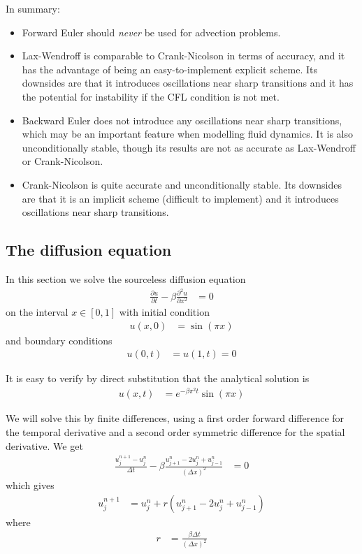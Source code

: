 \documentclass[twocolumn]{myarticle}
\begin{document}
In summary:
\begin{itemize}
\item
    Forward Euler should \emph{never} be used for advection problems.
\item
    Lax-Wendroff is comparable to Crank-Nicolson in terms of accuracy, and it has the advantage of being an easy-to-implement explicit scheme.
    Its downsides are that it introduces oscillations near sharp transitions and it has the potential for instability if the CFL condition is not met.
\item
    Backward Euler does not introduce any oscillations near sharp transitions, which may be an important feature when modelling fluid dynamics.
    It is also unconditionally stable, though its results are not as accurate as Lax-Wendroff or Crank-Nicolson.
\item
    Crank-Nicolson is quite accurate and unconditionally stable.
    Its downsides are that it is an implicit scheme (difficult to implement) and it introduces oscillations near sharp transitions.
\end{itemize}

\subsection{The diffusion equation}
\label{subsec:the_diffusion_equation}

In this section we solve the sourceless diffusion equation
\begin{align}
    \frac{\partial u}{\partial t} - \beta \frac{\partial^2 u}{\partial x^2} &= 0
\end{align}
on the interval $ x \in [0,1] $ with initial condition
\begin{align}
    u(x,0) &= \sin(\pi x)
\end{align}
and boundary conditions
\begin{align}
    u(0, t) &= u(1, t) = 0
\end{align}

It is easy to verify by direct substitution that the analytical solution is
\begin{align}
    u(x, t) &= e^{-\beta \pi^2 t} \sin(\pi x)
\end{align}

We will solve this by finite differences, using a first order forward difference for the temporal derivative and a second order symmetric difference for the spatial derivative.
We get
\begin{align}
    \frac{u^{n+1}_j - u^n_j}{\Delta t} - \beta \frac{u^{n}_{j+1} - 2 u^n_j + u^{n}_{j-1}}{(\Delta x)^2} &= 0
\end{align}
which gives
\begin{align}
    u^{n+1}_j &= u^n_j + r \left( u^{n}_{j+1} - 2 u^n_j + u^{n}_{j-1} \right)
\end{align}
where
\begin{align}
    r &= \frac{\beta \Delta t}{(\Delta x)^2}
\end{align}
\end{document}
